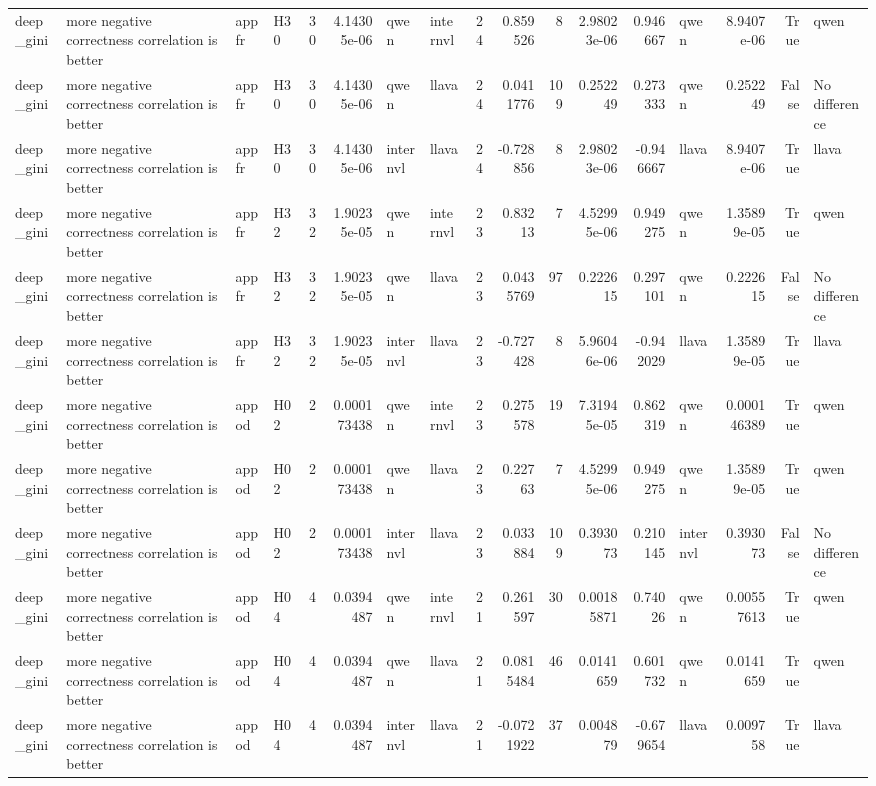 \begin{longtable}{llllrrllrrrrrlrrl}
deep\_gini & more negative correctness correlation is better & appfr & H30 & 30 & 4.14305e-06 & qwen & internvl & 24 & 0.859526 & 8 & 2.98023e-06 & 0.946667 & qwen & 8.9407e-06 & True & qwen \\
deep\_gini & more negative correctness correlation is better & appfr & H30 & 30 & 4.14305e-06 & qwen & llava & 24 & 0.0411776 & 109 & 0.252249 & 0.273333 & qwen & 0.252249 & False & No difference \\
deep\_gini & more negative correctness correlation is better & appfr & H30 & 30 & 4.14305e-06 & internvl & llava & 24 & -0.728856 & 8 & 2.98023e-06 & -0.946667 & llava & 8.9407e-06 & True & llava \\
deep\_gini & more negative correctness correlation is better & appfr & H32 & 32 & 1.90235e-05 & qwen & internvl & 23 & 0.83213 & 7 & 4.52995e-06 & 0.949275 & qwen & 1.35899e-05 & True & qwen \\
deep\_gini & more negative correctness correlation is better & appfr & H32 & 32 & 1.90235e-05 & qwen & llava & 23 & 0.0435769 & 97 & 0.222615 & 0.297101 & qwen & 0.222615 & False & No difference \\
deep\_gini & more negative correctness correlation is better & appfr & H32 & 32 & 1.90235e-05 & internvl & llava & 23 & -0.727428 & 8 & 5.96046e-06 & -0.942029 & llava & 1.35899e-05 & True & llava \\
deep\_gini & more negative correctness correlation is better & appod & H02 & 2 & 0.000173438 & qwen & internvl & 23 & 0.275578 & 19 & 7.31945e-05 & 0.862319 & qwen & 0.000146389 & True & qwen \\
deep\_gini & more negative correctness correlation is better & appod & H02 & 2 & 0.000173438 & qwen & llava & 23 & 0.22763 & 7 & 4.52995e-06 & 0.949275 & qwen & 1.35899e-05 & True & qwen \\
deep\_gini & more negative correctness correlation is better & appod & H02 & 2 & 0.000173438 & internvl & llava & 23 & 0.033884 & 109 & 0.393073 & 0.210145 & internvl & 0.393073 & False & No difference \\
deep\_gini & more negative correctness correlation is better & appod & H04 & 4 & 0.0394487 & qwen & internvl & 21 & 0.261597 & 30 & 0.00185871 & 0.74026 & qwen & 0.00557613 & True & qwen \\
deep\_gini & more negative correctness correlation is better & appod & H04 & 4 & 0.0394487 & qwen & llava & 21 & 0.0815484 & 46 & 0.0141659 & 0.601732 & qwen & 0.0141659 & True & qwen \\
deep\_gini & more negative correctness correlation is better & appod & H04 & 4 & 0.0394487 & internvl & llava & 21 & -0.0721922 & 37 & 0.004879 & -0.679654 & llava & 0.009758 & True & llava \\

\end{longtable}
